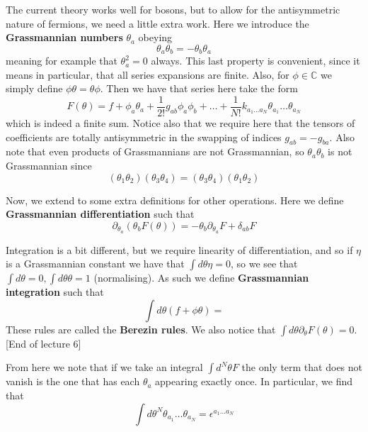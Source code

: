 \documentclass{article}
\theoremstyle{definition}
\begin{document}
The current theory works well for bosons, but to allow for the antisymmetric
nature of fermions, we need a little extra work. Here we introduce the
\textbf{Grassmannian numbers} $\theta_a$ obeying
\begin{equation}
  \theta_a \theta_b = - \theta_b \theta_a
\end{equation}
meaning for example that $\theta_a^2 = 0$ always. This last property is
convenient, since it means in particular, that all series expansions are finite.
Also, for $\phi \in \mathbb{C}$ we simply define $\phi \theta = \theta \phi$.
Then we have that series here take the form
\begin{equation}
  F(\theta) = f + \phi_a \theta_a + \frac{1}{2!} g_{ab} \phi_a \phi_b + \dots +
  \frac{1}{N!} k_{a_1 \dots a_N} \theta_{a_1} \dots \theta_{a_N}
\end{equation}
which is indeed a finite sum. Notice also that we require here that the tensors
of coefficients are totally antisymmetric in the swapping of indices $g_{ab} =
-g_{ba}$. Also note that even products of Grassmannians are not Grassmannian, so
$\theta_a \theta_b$ is not Grassmannian since
\begin{equation}
  (\theta_1 \theta_2) (\theta_3 \theta_4) = (\theta_3 \theta_4) (\theta_1 \theta_2)
\end{equation}

Now, we extend to some extra definitions for other operations. Here we define
\textbf{Grassmannian differentiation} such that
\begin{equation}
  \partial_{\theta_a} (\theta_b F(\theta)) = - \theta_b \partial_{\theta_a} F +
  \delta_{ab} F
\end{equation}

Integration is a bit different, but we require linearity of differentiation, and
so if $\eta$ is a Grassmannian constant we have that $\int d\theta \eta = 0$, so
we see that $\int d\theta = 0, \int d \theta \theta = 1$ (normalising). As such
we define \textbf{Grassmannian integration} such that
\begin{equation}
  \int d\theta (f + \phi \theta) =
\end{equation}
These rules are called the \textbf{Berezin rules}. We also notice that $\int
d\theta \partial_\theta F(\theta) = 0$. [End of lecture 6]

From here we note that if we take an integral $\int d^N\theta F$ the only term
that does not vanish is the one that has each $\theta_a$ appearing exactly once.
In particular, we find that
\begin{equation}
  \int d\theta^N \theta_{a_1} \dots \theta_{a_N} = \epsilon^{a_1 \dots a_N}
\end{equation}
\end{document}
